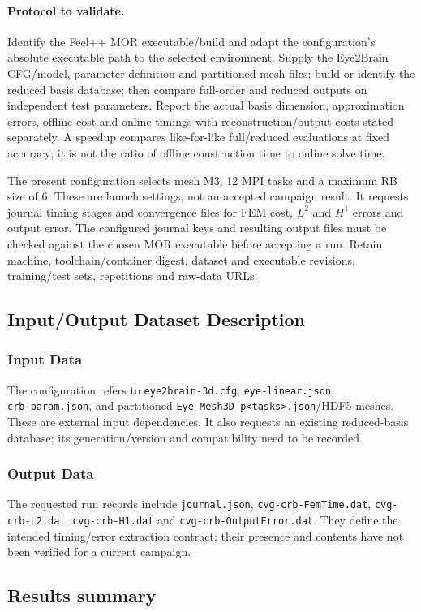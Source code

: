 \paragraph{Protocol to validate.}
Identify the Feel++ MOR executable/build and adapt the configuration's absolute
executable path to the selected environment. Supply the Eye2Brain CFG/model,
parameter definition and partitioned mesh files; build or identify the reduced
basis database; then compare full-order and reduced outputs on independent test
parameters. Report the actual basis dimension, approximation errors, offline
cost and online timings with reconstruction/output costs stated separately.
A speedup compares like-for-like full/reduced evaluations at fixed accuracy;
it is not the ratio of offline construction time to online solve time.

The present configuration selects mesh M3, 12 MPI tasks and a maximum RB
size of 6. These are launch settings, not an accepted campaign result.
It requests journal timing stages and convergence files for FEM cost, $L^2$ and
$H^1$ errors and output error. The configured journal keys and resulting output
files must be checked against the chosen MOR executable before accepting a run.
Retain machine, toolchain/container digest, dataset and executable revisions,
training/test sets, repetitions and raw-data URLs.

\subsection{Input/Output Dataset Description}

\subsubsection{Input Data}
The configuration refers to \nolinkurl{eye2brain-3d.cfg},
\nolinkurl{eye-linear.json}, \nolinkurl{crb_param.json}, and partitioned
\nolinkurl{Eye_Mesh3D_p<tasks>.json}/HDF5 meshes. These are external
input dependencies. It also requests an existing reduced-basis database;
its generation/version and compatibility need to be recorded.

\subsubsection{Output Data}
The requested run records include \texttt{journal.json},
\nolinkurl{cvg-crb-FemTime.dat}, \nolinkurl{cvg-crb-L2.dat},
\nolinkurl{cvg-crb-H1.dat} and \nolinkurl{cvg-crb-OutputError.dat}.
They define the intended timing/error extraction contract; their presence and
contents have not been verified for a current campaign.

\subsection{Results summary}


